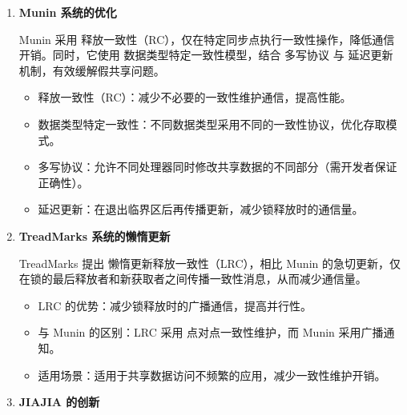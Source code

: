 {\begin{enumerate}[leftmargin=1em, align=left]
          1986 年，Li Kai 博士在论文\citep{likai1986svm} 中验证了在分布式系统上构建共享虚拟内存（SVM）的可行性，并开发了首个软件 DSM 系统 IVY\citep{likai1988ivy}。IVY 采用 页粒度共享，支持 SWMR 访问模式，通过 顺序一致性 保持数据一致性，在并行计算中取得良好加速效果。

          \begin{itemize}
            \item IVY 的创新：采用 单写多读（SWMR） 访问模式，保证顺序一致性。
            \item 优点：显著提高并行程序的加速比，减少显式通信需求。
            \item 缺点：通信开销较大，存在 假共享 问题。
          \end{itemize}
    \item \textbf{Munin 系统的优化}

          Munin\citep{bennett1990munin} 采用 释放一致性（RC），仅在特定同步点执行一致性操作，降低通信开销。同时，它使用 数据类型特定一致性模型，结合 多写协议 与 延迟更新机制，有效缓解假共享问题。

          \begin{itemize}
            \item 释放一致性（RC）：减少不必要的一致性维护通信，提高性能。
            \item 数据类型特定一致性：不同数据类型采用不同的一致性协议，优化存取模式。
            \item 多写协议：允许不同处理器同时修改共享数据的不同部分（需开发者保证正确性）。
            \item 延迟更新：在退出临界区后再传播更新，减少锁释放时的通信量。
          \end{itemize}
    \item \textbf{TreadMarks 系统的懒惰更新}

          TreadMarks\citep{amza1996treadmarks} 提出 懒惰更新释放一致性（LRC），相比 Munin 的急切更新，仅在锁的最后释放者和新获取者之间传播一致性消息，从而减少通信量。

          \begin{itemize}
            \item LRC 的优势：减少锁释放时的广播通信，提高并行性。
            \item 与 Munin 的区别：LRC 采用 点对点一致性维护，而 Munin 采用广播通知。
            \item 适用场景：适用于共享数据访问不频繁的应用，减少一致性维护开销。
          \end{itemize}
    \item \textbf{JIAJIA 的创新}


\end{enumerate}}
